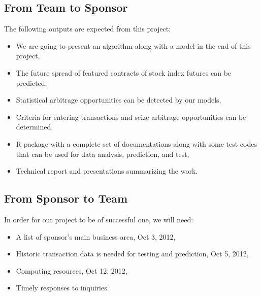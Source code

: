 \documentclass[12pt,letterpaper]{article}
\theoremstyle{definition}
\begin{document}
\subsection{From Team to Sponsor} %
The following outputs are expected from this project:
\begin{itemize}
   \item We are going to present an algorithm along with a model in the end of this project,
     \item The future spread of featured contracts of stock index futures can be predicted, 
    \item Statistical arbitrage opportunities can be detected by our models,
    \item Criteria for entering transactions and seize arbitrage opportunities can be determined,
    \item	R package with a complete set of documentations along with some test codes that can be used for data analysis, prediction, and test,
    \item Technical report and presentations summarizing the work.
\end{itemize}

\subsection{From Sponsor to Team} %

In order for our project to be of successful one, we will need:
\begin{itemize}
    \item A list of sponsor's main business area, Oct 3, 2012,
    \item Historic transaction data is needed for testing and prediction, Oct 5, 2012,
    \item Computing resources, Oct 12, 2012,
    \item Timely responses to inquiries.
\end{itemize}


%
%
\end{document}
